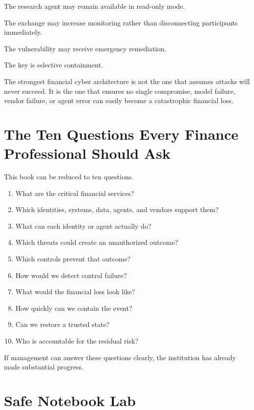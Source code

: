 The research agent may remain available in read-only mode.

The exchange may increase monitoring rather than disconnecting participants immediately.

The vulnerability may receive emergency remediation.

The key is selective containment.

\begin{risklens}
The strongest financial cyber architecture is not the one that assumes attacks will never succeed. It is the one that ensures no single compromise, model failure, vendor failure, or agent error can easily become a catastrophic financial loss.
\end{risklens}

\section{The Ten Questions Every Finance Professional Should Ask}

This book can be reduced to ten questions.

\begin{enumerate}
    \item What are the critical financial services?
    \item Which identities, systems, data, agents, and vendors support them?
    \item What can each identity or agent actually do?
    \item Which threats could create an unauthorized outcome?
    \item Which controls prevent that outcome?
    \item How would we detect control failure?
    \item What would the financial loss look like?
    \item How quickly can we contain the event?
    \item Can we restore a trusted state?
    \item Who is accountable for the residual risk?
\end{enumerate}

If management can answer these questions clearly, the institution has already made substantial progress.

\section{Safe Notebook Lab}

